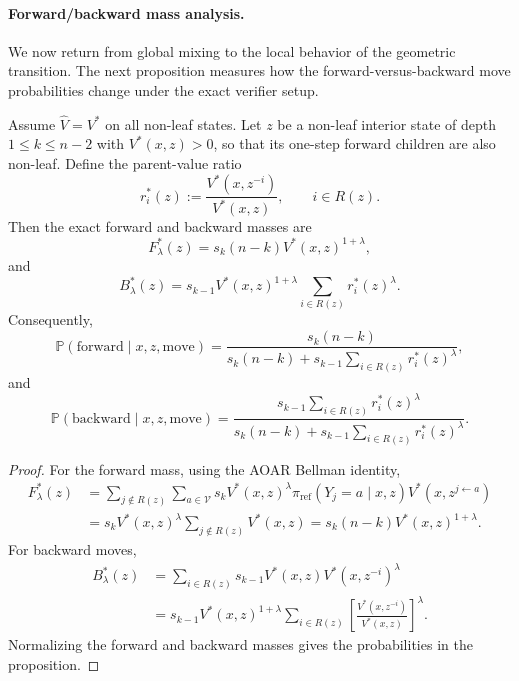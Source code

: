 \documentclass{article}
\numberwithin{theorem}{section}
\numberwithin{proposition}{section}
\numberwithin{corollary}{section}
\numberwithin{lemma}{section}
\numberwithin{conjecture}{section}
\numberwithin{remark}{section}
\numberwithin{definition}{section}
\numberwithin{assumption}{section}
\numberwithin{example}{section}
\newcommand{\calV}{{\mathcal{V}}}
\newcommand{\bbP}{\mathbb{P}}
\providecommand{\base}{\pi_{\mathrm{ref}}}
\begin{document}
\paragraph{Forward/backward mass analysis.}

We now return from global mixing to the local behavior of the geometric
transition. The next proposition measures how the
forward-versus-backward move probabilities change under the exact verifier setup.

\begin{proposition}
\label{prop:bg_aoar_directional_masses}
Assume $\widehat V=V^*$ on all non-leaf states. Let $z$ be a non-leaf interior state of depth $1\le k\le n-2$ with $V^*(x,z)>0$, so that its one-step forward children are also non-leaf. Define the parent-value ratio
\begin{equation*}
    r_i^*(z)
    :=
    \frac{V^*(x,z^{-i})}{V^*(x,z)},
    \qquad i\in R(z).
\end{equation*}
Then the exact forward and backward masses are
\begin{equation*}
    F_\lambda^*(z)
    =
    s_k(n-k)V^*(x,z)^{1+\lambda},
\end{equation*}
and
\begin{equation*}
    B_\lambda^*(z)
    =
    s_{k-1}V^*(x,z)^{1+\lambda}
    \sum_{i\in R(z)} r_i^*(z)^\lambda.
\end{equation*}
Consequently,
\begin{equation*}
    \bbP(\mathrm{forward}\mid x,z,\mathrm{move})
    =
    \frac{s_k(n-k)}
    {s_k(n-k)+s_{k-1}\sum_{i\in R(z)}r_i^*(z)^\lambda},
\end{equation*}
and
\begin{equation*}
    \bbP(\mathrm{backward}\mid x,z,\mathrm{move})
    =
    \frac{s_{k-1}\sum_{i\in R(z)}r_i^*(z)^\lambda}
    {s_k(n-k)+s_{k-1}\sum_{i\in R(z)}r_i^*(z)^\lambda}.
\end{equation*}
\end{proposition}

\begin{proof}
For the forward mass, using the AOAR Bellman identity,
\begin{align*}
    F_\lambda^*(z)
    &=
    \sum_{j\notin R(z)}
    \sum_{a\in\calV}
    s_kV^*(x,z)^\lambda
    \base(Y_j=a\mid x,z)
    V^*(x,z^{j\leftarrow a})\\
    &=
    s_kV^*(x,z)^\lambda
    \sum_{j\notin R(z)}V^*(x,z)
    =
    s_k(n-k)V^*(x,z)^{1+\lambda}.
\end{align*}
For backward moves,
\begin{align*}
    B_\lambda^*(z)
    &=
    \sum_{i\in R(z)}
    s_{k-1}V^*(x,z)V^*(x,z^{-i})^\lambda\\
    &=
    s_{k-1}V^*(x,z)^{1+\lambda}
    \sum_{i\in R(z)}
    \left[
        \frac{V^*(x,z^{-i})}{V^*(x,z)}
    \right]^\lambda.
\end{align*}
Normalizing the forward and backward masses gives the probabilities in the proposition.
\end{proof}
\end{document}
